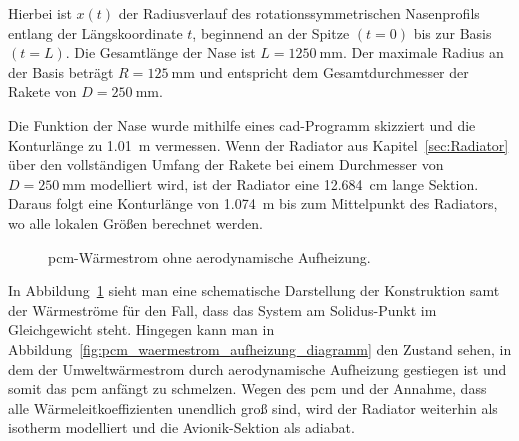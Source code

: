 Hierbei ist $x(t)$ der Radiusverlauf des rotationssymmetrischen Nasenprofils entlang der Längskoordinate $t$, beginnend an der Spitze $(t=0)$ bis zur Basis $(t=L)$.
Die Gesamtlänge der Nase ist $L = \SI{1250}{\milli\meter}$. Der maximale Radius an der Basis beträgt $R = \SI{125}{\milli\meter}$ und entspricht dem Gesamtdurchmesser der Rakete von $D = \SI{250}{\milli\meter}$.

Die Funktion der Nase wurde mithilfe eines \ac{cad}-Programm skizziert und die Konturlänge zu \SI{1,01}{\meter} vermessen. Wenn der Radiator aus Kapitel~\ref{sec:Radiator} über den vollständigen Umfang der Rakete
bei einem Durchmesser von $D = \SI{250}{\milli\meter}$ modelliert wird, ist der Radiator eine \SI{12,684}{\centi\meter} lange Sektion.
Daraus folgt eine Konturlänge von \SI{1,074}{\meter} bis zum Mittelpunkt des Radiators, wo alle lokalen Größen berechnet werden.

\begin{figure}
  \centering
  \caption{\acs{pcm}-Wärmestrom ohne aerodynamische Aufheizung.}\label{fig:pcm_waermestrom_diagramm}
\end{figure}

In Abbildung~\ref{fig:pcm_waermestrom_diagramm} sieht man eine schematische Darstellung der Konstruktion samt der Wärmeströme
für den Fall, dass das System am Solidus-Punkt im Gleichgewicht steht. Hingegen kann man in Abbildung~\ref{fig:pcm_waermestrom_aufheizung_diagramm}
den Zustand sehen, in dem der Umweltwärmestrom durch aerodynamische Aufheizung gestiegen ist und somit das \ac{pcm} anfängt zu schmelzen.
Wegen des \ac{pcm} und der Annahme, dass alle Wärmeleitkoeffizienten unendlich groß sind, wird der Radiator weiterhin als isotherm modelliert und die Avionik-Sektion als
adiabat.

